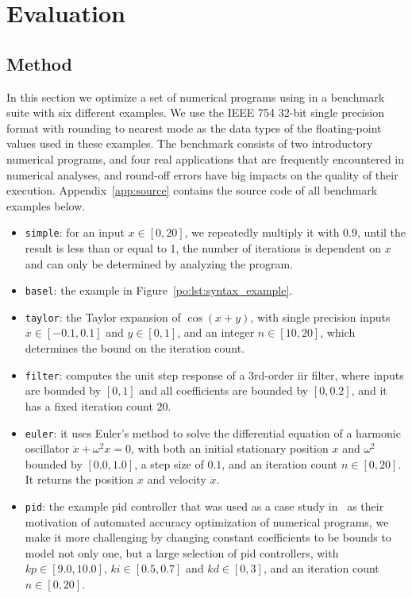 \section{Evaluation}
\label{po:sec:results}

\subsection{Method}

In this section we optimize a set of numerical programs using \soap{} in a
benchmark suite with six different examples.  We use the IEEE 754 32-bit
single precision format with rounding to nearest mode as the data types of the
floating-point values used in these examples.  The benchmark consists of two
introductory numerical programs, and four real applications that are frequently
encountered in numerical analyses, and round-off errors have big impacts on the
quality of their execution.  Appendix~\ref{app:source} contains the source code
of all benchmark examples below.
\begin{itemize}

    \item \texttt{simple}: for an input $x \in [0, 20]$, we repeatedly multiply
    it with $0.9$, until the result is less than or equal to 1, the number of
    iterations is dependent on $x$ and can only be determined by analyzing the
    program.

    \item \texttt{basel}: the example in Figure~\ref{po:lst:syntax_example}.

    \item \texttt{taylor}: the Taylor expansion of $\cos(x + y)$, with single
    precision inputs $x \in [-0.1, 0.1]$ and $y \in [0, 1]$, and an integer $n
    \in [10, 20]$, which determines the bound on the iteration count.

    \item \texttt{filter}: computes the unit step response of a 3rd-order
    \gls{iir} filter, where inputs are bounded by $[0, 1]$ and all coefficients
    are bounded by $[0, 0.2]$, and it has a fixed iteration count $20$.

    \item \texttt{euler}: it uses Euler's method to solve the differential
    equation of a harmonic oscillator $\ddot{x} + \omega^2 x = 0$, with both an
    initial stationary position $x$ and $\omega^2$ bounded by $[0.0, 1.0]$, a
    step size of $0.1$, and an iteration count $n \in [0, 20]$.  It returns the
    position $x$ and velocity $\dot{x}$.

    \item \texttt{pid}: the example \gls{pid} controller that was used as a
    case study in~\cite{damouche14} as their motivation of automated accuracy
    optimization of numerical programs, we make it more challenging by changing
    constant coefficients to be bounds to model not only one, but a large
    selection of \gls{pid} controllers, with $kp \in [9.0, 10.0]$, $ki \in
    [0.5, 0.7]$ and $kd \in [0, 3]$, and an iteration count $n \in [0, 20]$.

\end{itemize}

